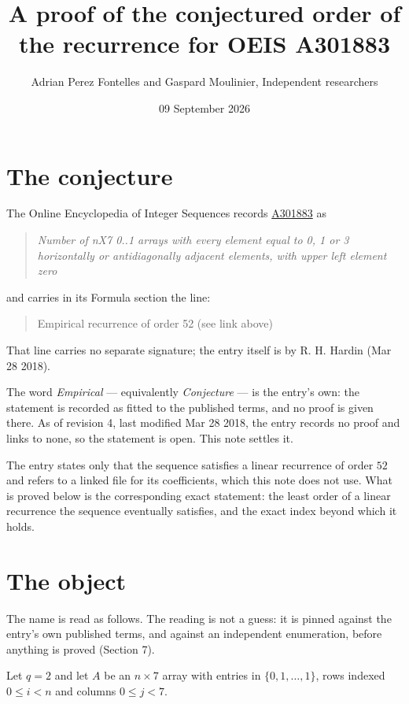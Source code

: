 \documentclass[11pt]{article}
\title{A proof of the conjectured order of the recurrence for OEIS A301883}
\author{Adrian Perez Fontelles and Gaspard Moulinier, Independent researchers}
\date{09 September 2026}
\theoremstyle{definition}
\begin{document}
\maketitle
\section{The conjecture}

The Online Encyclopedia of Integer Sequences records \href{https://oeis.org/A301883}{A301883} as

\begin{quote}\itshape Number of nX7 0..1 arrays with every element equal to 0, 1 or 3 horizontally or antidiagonally adjacent elements, with upper left element zero\end{quote}

and carries in its Formula section the line:

\begin{quote}\ttfamily Empirical recurrence of order 52 (see link above)\end{quote}

That line carries no separate signature; the entry itself is by R. H. Hardin (Mar 28 2018).

The word {\itshape Empirical} --- equivalently {\itshape Conjecture} --- is the entry's own: the statement is recorded as fitted to the published terms, and no proof is given there. As of revision 4, last modified Mar 28 2018, the entry records no proof and links to none, so the statement is open. This note settles it.

The entry states only that the sequence satisfies a linear recurrence of order $52$ and refers to a linked file for its coefficients, which this note does not use. What is proved below is the corresponding exact statement: the least order of a linear recurrence the sequence eventually satisfies, and the exact index beyond which it holds.

\section{The object}

The name is read as follows. The reading is not a guess: it is pinned against the entry's own published terms, and against an independent enumeration, before anything is proved (Section 7).

Let $q = 2$ and let $A$ be an $n \times 7$ array with entries in $\{0,1,\dots,1\}$, rows indexed $0 \le i < n$ and columns $0 \le j < 7$.
\end{document}
